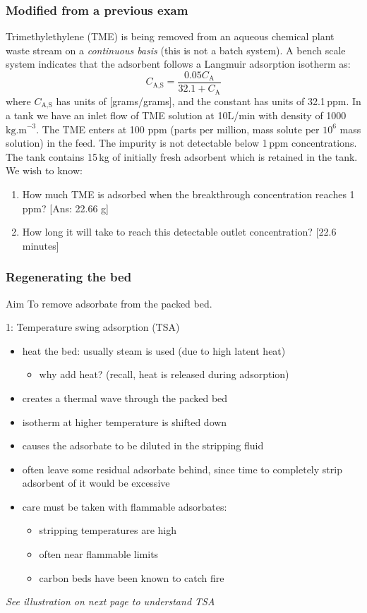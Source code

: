 \begin{frame}\frametitle{Modified from a previous exam}

	Trimethylethylene (TME) is being removed from an aqueous chemical plant waste stream on a \emph{continuous basis} (this is not a batch system). A bench scale system indicates that the adsorbent follows a Langmuir adsorption isotherm as:
	\[
		C_\text{A,S} = \frac{0.05C_\text{A}}{32.1 + C_\text{A}}
	\]
	where $C_\text{A,S}$ has units of [grams/grams], and the constant has units of 32.1\,ppm. In a tank we have an inlet flow of TME solution at 10L/min with density of 1000\,$\text{kg.m}^{-3}$. The TME enters at 100 ppm (parts per million, mass solute per $10^6$ mass solution) in the feed. The impurity is not detectable below 1\,ppm concentrations. The tank contains 15\,kg of initially fresh adsorbent which is retained in the tank. We wish to know:

	\begin{enumerate}
		\item	How much TME is adsorbed when the breakthrough concentration reaches 1 ppm? {\small\color{myOrange}[Ans: 22.66 g]}
		\item	How long it will take to reach this detectable outlet concentration? {\small\color{myOrange}[22.6 minutes]}
	\end{enumerate}
\end{frame}

\begin{frame}\frametitle{Regenerating the bed}
	\begin{exampleblock}{Aim}
		To remove adsorbate from the packed bed.
	\end{exampleblock}

	1: Temperature swing adsorption (TSA)
	\begin{itemize}
		\item	heat the bed: usually steam is used (due to high latent heat)
		\begin{itemize}
			\item	why add heat? (recall, heat is released during adsorption)
		\end{itemize}
		\item	creates a thermal wave through the packed bed
		\item	isotherm at higher temperature is shifted down
		\item	causes the adsorbate to be diluted in the stripping fluid
		\item	often leave some residual adsorbate behind, since time to completely strip adsorbent of it would be excessive
		\item	care must be taken with flammable adsorbates:
		\begin{itemize}
			\item	stripping temperatures are high
			\item	often near flammable limits
			\item	carbon beds have been known to catch fire
		\end{itemize}
	\end{itemize}
	\emph{See illustration on next page to understand TSA}
\end{frame}

